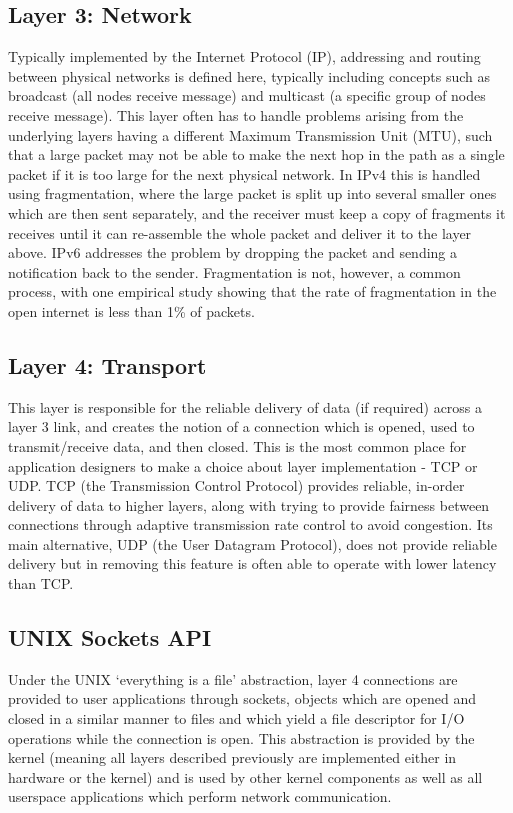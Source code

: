 \documentclass[a4paper,12pt,twoside,openright]{report}
\begin{document}
	\subsection{Layer 3: Network}
	Typically implemented by the Internet Protocol (IP), addressing and routing between physical networks is defined here, typically including concepts such as broadcast (all nodes receive message) and multicast (a specific group of nodes receive message). This layer often has to handle problems arising from the underlying layers having a different Maximum Transmission Unit (MTU), such that a large packet may not be able to make the next hop in the path as a single packet if it is too large for the next physical network. In IPv4 this is handled using fragmentation, where the large packet is split up into several smaller ones which are then sent separately, and the receiver must keep a copy of fragments it receives until it can re-assemble the whole packet and deliver it to the layer above. IPv6 addresses the problem by dropping the packet and sending a notification back to the sender. Fragmentation is not, however, a common process, with one empirical study showing that the rate of fragmentation in the open internet is less than 1\% of packets\cite{frag}.
	
	\subsection{Layer 4: Transport}
	This layer is responsible for the reliable delivery of data (if required) across a layer 3 link, and creates the notion of a connection which is opened, used to transmit/receive data, and then closed. This is the most common place for application designers to make a choice about layer implementation - TCP or UDP. TCP (the Transmission Control Protocol) provides reliable, in-order delivery of data to higher layers, along with trying to provide fairness between connections through adaptive transmission rate control to avoid congestion. Its main alternative, UDP (the User Datagram Protocol), does not provide reliable delivery but in removing this feature is often able to operate with lower latency than TCP.
	
	\subsection{UNIX Sockets API}
	Under the UNIX `everything is a file' abstraction, layer 4 connections are provided to user applications through sockets, objects which are opened and closed in a similar manner to files and which yield a file descriptor for I/O operations while the connection is open. This abstraction is provided by the kernel (meaning all layers described previously are implemented either in hardware or the kernel) and is used by other kernel components as well as all userspace applications which perform network communication.
	
\end{document}
